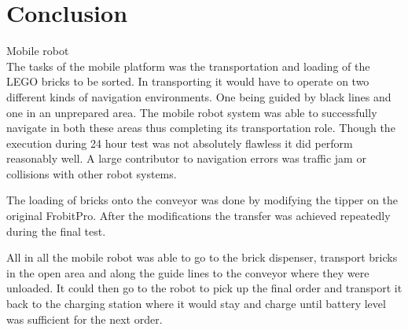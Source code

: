 \chapter{Conclusion}\label{chap:conclusion}
Mobile robot\\
The tasks of the mobile platform was the transportation and loading of the LEGO bricks to be sorted. In transporting it would have to operate on two different kinds of navigation environments. One being guided by black lines and one in an unprepared area. The mobile robot system was able to successfully navigate in both these areas thus completing its transportation role. Though the execution during 24 hour test was not absolutely flawless it did perform reasonably well. A large contributor to navigation errors was traffic jam or collisions with other robot systems. 

The loading of bricks onto the conveyor was done by modifying the tipper on the original FrobitPro. After the modifications the transfer was achieved repeatedly  during the final test. 

All in all the mobile robot was able to go to the brick dispenser, transport bricks in the open area and along the guide lines to the conveyor where they were unloaded. It could then go to the robot to pick up the final order and transport it back to the charging station where it would stay and charge until battery level was sufficient for the next order.


